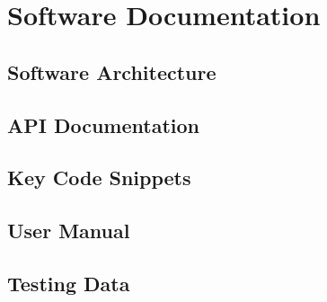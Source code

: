 \chapter{Software Documentation}
\label{appendix:software}




\section{Software Architecture}



\section{API Documentation}



\section{Key Code Snippets}



%
%


\section{User Manual}



\section{Testing Data}

